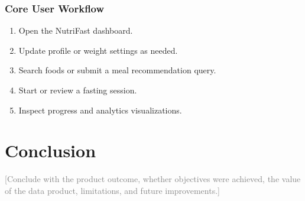 \documentclass[12pt]{report}
\newcommand{\placeholder}[1]{\textcolor{gray}{[#1]}}
\begin{document}
\subsection{Core User Workflow}
\begin{enumerate}
    \item Open the NutriFast dashboard.
    \item Update profile or weight settings as needed.
    \item Search foods or submit a meal recommendation query.
    \item Start or review a fasting session.
    \item Inspect progress and analytics visualizations.
\end{enumerate}

\chapter{Conclusion}
\placeholder{Conclude with the product outcome, whether objectives were achieved, the value of the data product, limitations, and future improvements.}

\appendix
\end{document}
